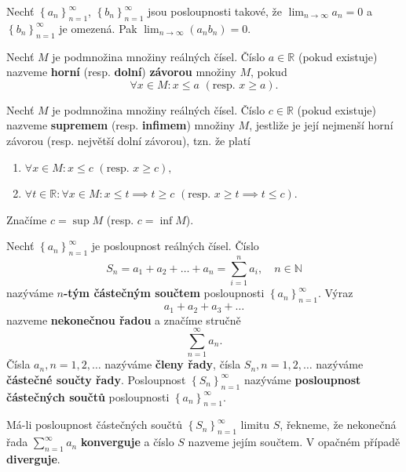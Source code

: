 \begin{veta}
    Nechť $\left \{ a_n \right \}_{n=1}^\infty $, $\left \{ b_n \right \}_{n=1}^\infty $
    jsou posloupnosti takové, že $\lim_{n\to\infty}a_n=0$ a $\left \{ b_n \right \}_{n=1}^\infty $
    je omezená. Pak $\lim_{n\to\infty}\left ( a_nb_n \right ) =0.$
\end{veta}

\begin{definition}
Nechť $M$ je podmnožina množiny reálných čísel. Číslo $a\in \mathbb R$ (pokud existuje)
nazveme \textbf{horní} (resp. \textbf{dolní}) \textbf{závorou} množiny $M$, pokud
$$\forall x \in M\colon x\leq a \,\, (\textrm{resp. }x\geq a).$$
\end{definition}

\begin{definition}\label{supinf}
Nechť $M$ je podmnožina množiny reálných čísel. Číslo $c\in \mathbb R$ (pokud existuje)
nazveme \textbf{supremem} (resp. \textbf{infimem}) množiny $M$, jestliže je její
nejmenší horní závorou (resp. největší dolní závorou), tzn. že platí
\begin{enumerate}[$i.$]
\item $\forall x\in M\colon x\leq c \,\, (\textrm{resp. } x\geq c),$
\item $\forall t\in \mathbb R\colon \forall x\in  M\colon x\leq t \implies t\geq c \,\, (\textrm{resp. }x\geq t \implies t\leq c).$
\end{enumerate}
Značíme $c=\sup M$ (resp. $c=\inf M$).
\end{definition}

\begin{definition}
Nechť $\left \{ a_n \right \}_{n=1}^\infty $ je posloupnost reálných čísel. Číslo
$$S_n=a_1+a_2+\dots+a_n = \sum_{i=1}^n a_i,\quad n\in \mathbb N$$
nazýváme \textbf{$n$-tým částečným součtem} posloupnosti $\left \{ a_n \right \}_{n=1}^\infty $. Výraz
$$a_1+a_2+a_3+\dots$$
nazveme \textbf{nekonečnou řadou} a značíme stručně
$$\sum_{n=1}^\infty a_n.$$
Čísla $a_n, n=1,2,\dots$ nazýváme \textbf{členy řady}, čísla $S_n, n=1,2,\dots$
nazýváme \textbf{částečné součty řady}.
Posloupnost $\left \{ S_n \right \}_{n=1}^\infty $ nazýváme \textbf{posloupnost
částečných součtů} posloupnosti $\left \{ a_n \right \}_{n=1}^\infty $.
\end{definition}

\begin{definition}
Má-li posloupnost částečných součtů $\left \{ S_n \right \}_{n=1}^\infty $
limitu $S$, řekneme, že nekonečná řada $\sum_{n=1}^\infty a_n$ \textbf{konverguje}
a číslo $S$ nazveme jejím součtem. V opačném případě \textbf{diverguje}.
\end{definition}

